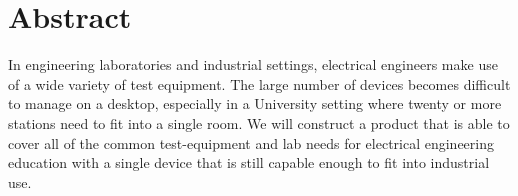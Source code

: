 \section{Abstract}
In engineering laboratories and industrial settings, electrical engineers make use of a wide variety of test equipment. The large number of devices becomes difficult to manage on a desktop, especially in a University setting where twenty or more stations need to fit into a single room. We will construct a product that is able to cover all of the common test-equipment and lab needs for electrical engineering education with a single device that is still capable enough to fit into industrial use.
